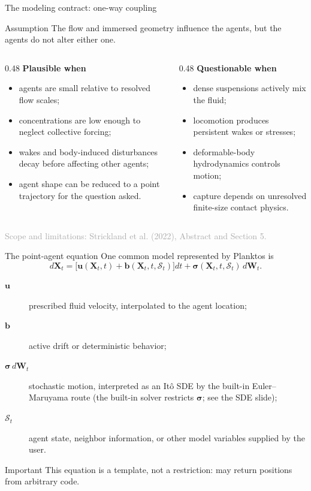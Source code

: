 \documentclass[aspectratio=169,11pt]{beamer}
\newcommand{\XX}{\bm{X}}
\newcommand{\uu}{\bm{u}}
\newcommand{\bb}{\bm{b}}
\newcommand{\sourcecredit}[1]{\vfill\begin{flushright}\tiny\textcolor{DarkGray}{#1}\end{flushright}}
\begin{document}
\begin{frame}{The modeling contract: one-way coupling}
\begin{block}{Assumption}
The flow and immersed geometry influence the agents, but the agents do not alter either one.
\end{block}
\begin{columns}[T,onlytextwidth]
  \begin{column}{0.48\textwidth}
    \textbf{Plausible when}
    \begin{itemize}
      \item agents are small relative to resolved flow scales;
      \item concentrations are low enough to neglect collective forcing;
      \item wakes and body-induced disturbances decay before affecting other agents;
      \item agent shape can be reduced to a point trajectory for the question asked.
    \end{itemize}
  \end{column}
  \begin{column}{0.48\textwidth}
    \textbf{Questionable when}
    \begin{itemize}
      \item dense suspensions actively mix the fluid;
      \item locomotion produces persistent wakes or stresses;
      \item deformable-body hydrodynamics controls motion;
      \item capture depends on unresolved finite-size contact physics.
    \end{itemize}
  \end{column}
\end{columns}
\sourcecredit{Scope and limitations: Strickland et al. (2022), Abstract and Section 5.}
\end{frame}

\begin{frame}{The point-agent equation}
One common model represented by Planktos is
\[
  d\XX_t=\big[\uu(\XX_t,t)+\bb(\XX_t,t,\mathcal S_t)\big]dt
  +\bm{\sigma}(\XX_t,t,\mathcal S_t)\,d\bm W_t.
\]
\begin{description}
  \item[$\uu$] prescribed fluid velocity, interpolated to the agent location;
  \item[$\bb$] active drift or deterministic behavior;
  \item[$\bm\sigma\,d\bm W_t$] stochastic motion, interpreted as an It\^o SDE by the built-in Euler--Maruyama route (the built-in solver restricts $\bm\sigma$; see the SDE slide);
  \item[$\mathcal S_t$] agent state, neighbor information, or other model variables supplied by the user.
\end{description}
\begin{alertblock}{Important}
This equation is a template, not a restriction:  may return positions from arbitrary code.
\end{alertblock}
\end{frame}
\end{document}
